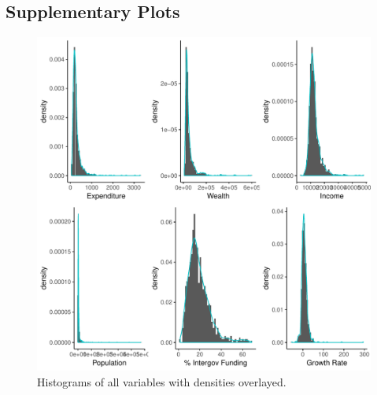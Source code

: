 \documentclass{article}\usepackage[]{graphicx}\usepackage[]{color}
\makeatletter
\def\maxwidth{ %
  \ifdim\Gin@nat@width>\linewidth
    \linewidth
  \else
    \Gin@nat@width
  \fi
}
\newenvironment{knitrout}{}{} %
\makeatother
\begin{document}
\newpage
\begin{appendices}

\section{Supplementary Plots} \label{appendix_plots}


\begin{knitrout}
\color{fgcolor}\begin{figure}[h!]
\includegraphics[width=\maxwidth]{figure/r_append_hist-1} \caption[Histograms of all variables with densities overlayed]{Histograms of all variables with densities overlayed.}\label{fig:r append_hist}
\end{figure}


\end{knitrout}




\end{appendices}
\end{document}
